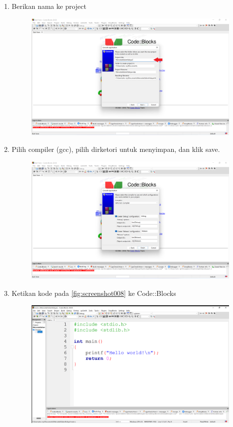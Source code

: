 \begin{enumerate}
\begin{figure}[H]
	\caption{}
	\label{fig:screenshot005}
\end{figure}
\item Berikan nama ke project
\begin{figure}[H]
	\centering
	\includegraphics[width=0.7\linewidth]{../P1/img/screenshot006.png}
	\caption{}
	\label{fig:screenshot006}
\end{figure}
\item  Pilih compiler (gcc), pilih dirketori untuk menyimpan, dan klik save.
\begin{figure}[H]
	\centering
	\includegraphics[width=0.7\linewidth]{../P1/img/screenshot007.png}
	\caption{}
	\label{fig:screenshot007}
\end{figure}
\item Ketikan kode pada \ref{fig:screenshot008} ke Code::Blocks 
\begin{figure}[H]
	\centering
	\includegraphics[width=0.7\linewidth]{../P1/img/screenshot008.png}

\end{figure}
\end{enumerate}
